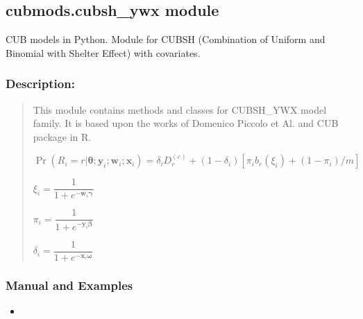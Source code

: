\documentclass[letterpaper,10pt,english]{sphinxmanual}
\begin{document}
\subsection{cubmods.cubsh\_ywx module}
\label{\detokenize{cubmods:module-cubmods.cubsh_ywx}}\label{\detokenize{cubmods:cubmods-cubsh-ywx-module}}\label{\detokenize{cubmods:cubshywx-module}}
\sphinxAtStartPar
CUB models in Python.
Module for CUBSH (Combination of Uniform
and Binomial with Shelter Effect) with covariates.


\subsubsection{Description:}
\label{\detokenize{cubmods:id376}}\begin{quote}

\sphinxAtStartPar
This module contains methods and classes
for CUBSH\_YWX model family.
It is based upon the works of Domenico
Piccolo et Al. and CUB package in R.

\sphinxAtStartPar
\(\Pr(R_i=r|\pmb\theta;\pmb y_i; \pmb w_i; \pmb x_i) = \delta_i D_r^{(c)} + (1 - \delta_i)[ \pi_i b_r(\xi_i) + (1-\pi_i)/m ]\)

\sphinxAtStartPar
\(\xi_i = \dfrac{1}{1+e^{-\pmb w_i \pmb\gamma}}\)

\sphinxAtStartPar
\(\pi_i = \dfrac{1}{1+e^{-\pmb y_i \pmb\beta}}\)

\sphinxAtStartPar
\(\delta_i = \dfrac{1}{1+e^{-\pmb x_i \pmb\omega}}\)
\end{quote}


\subsubsection{Manual and Examples}
\label{\detokenize{cubmods:id377}}\begin{itemize}
\item {} 
\sphinxAtStartPar
{}

\end{itemize}
\end{document}
